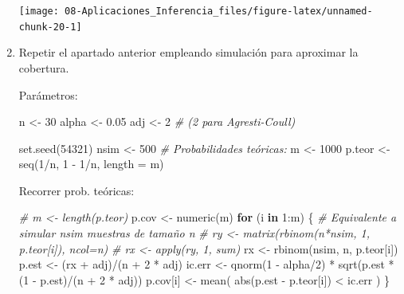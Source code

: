 \documentclass[
]{book}
\newenvironment{Shaded}{\begin{snugshade}}{\end{snugshade}}
\newcommand{\AttributeTok}[1]{\textcolor[rgb]{0.77,0.63,0.00}{#1}}
\newcommand{\CommentTok}[1]{\textcolor[rgb]{0.56,0.35,0.01}{\textit{#1}}}
\newcommand{\ControlFlowTok}[1]{\textcolor[rgb]{0.13,0.29,0.53}{\textbf{#1}}}
\newcommand{\DecValTok}[1]{\textcolor[rgb]{0.00,0.00,0.81}{#1}}
\newcommand{\FloatTok}[1]{\textcolor[rgb]{0.00,0.00,0.81}{#1}}
\newcommand{\FunctionTok}[1]{\textcolor[rgb]{0.00,0.00,0.00}{#1}}
\newcommand{\NormalTok}[1]{#1}
\newcommand{\OtherTok}[1]{\textcolor[rgb]{0.56,0.35,0.01}{#1}}
\newcommand{\SpecialCharTok}[1]{\textcolor[rgb]{0.00,0.00,0.00}{#1}}
\theoremstyle{break}
\theoremstyle{definition}
\theoremstyle{definition}
\theoremstyle{definition}
\theoremstyle{definition}
\theoremstyle{remark}
\begin{document}
\begin{enumerate}
  \begin{center}\texttt{[image: 08-Aplicaciones\_Inferencia\_files/figure-latex/unnamed-chunk-20-1]} \end{center}
\item
  Repetir el apartado anterior empleando simulación para aproximar
  la cobertura.

  Parámetros:

\begin{Shaded}
\begin{Highlighting}[]
\NormalTok{n }\OtherTok{\textless{}{-}} \DecValTok{30}
\NormalTok{alpha }\OtherTok{\textless{}{-}} \FloatTok{0.05}
\NormalTok{adj }\OtherTok{\textless{}{-}} \DecValTok{2}  \CommentTok{\#\textquotesingle{} (2 para Agresti{-}Coull)}

\FunctionTok{set.seed}\NormalTok{(}\DecValTok{54321}\NormalTok{)}
\NormalTok{nsim }\OtherTok{\textless{}{-}} \DecValTok{500} 
\CommentTok{\# Probabilidades teóricas:}
\NormalTok{m }\OtherTok{\textless{}{-}} \DecValTok{1000}
\NormalTok{p.teor }\OtherTok{\textless{}{-}} \FunctionTok{seq}\NormalTok{(}\DecValTok{1}\SpecialCharTok{/}\NormalTok{n, }\DecValTok{1} \SpecialCharTok{{-}} \DecValTok{1}\SpecialCharTok{/}\NormalTok{n, }\AttributeTok{length =}\NormalTok{ m) }
\end{Highlighting}
\end{Shaded}

  Recorrer prob. teóricas:

\begin{Shaded}
\begin{Highlighting}[]
\CommentTok{\# m \textless{}{-} length(p.teor)}
\NormalTok{p.cov }\OtherTok{\textless{}{-}} \FunctionTok{numeric}\NormalTok{(m)}
\ControlFlowTok{for}\NormalTok{ (i }\ControlFlowTok{in} \DecValTok{1}\SpecialCharTok{:}\NormalTok{m) \{}
  \CommentTok{\# Equivalente a simular nsim muestras de tamaño n}
  \CommentTok{\# ry \textless{}{-} matrix(rbinom(n*nsim, 1, p.teor[i]), ncol=n)}
  \CommentTok{\# rx \textless{}{-} apply(ry, 1, sum)}
\NormalTok{  rx }\OtherTok{\textless{}{-}} \FunctionTok{rbinom}\NormalTok{(nsim, n, p.teor[i])}
\NormalTok{  p.est }\OtherTok{\textless{}{-}}\NormalTok{ (rx }\SpecialCharTok{+}\NormalTok{ adj)}\SpecialCharTok{/}\NormalTok{(n }\SpecialCharTok{+} \DecValTok{2} \SpecialCharTok{*}\NormalTok{ adj)  }
\NormalTok{  ic.err }\OtherTok{\textless{}{-}} \FunctionTok{qnorm}\NormalTok{(}\DecValTok{1} \SpecialCharTok{{-}}\NormalTok{ alpha}\SpecialCharTok{/}\DecValTok{2}\NormalTok{) }\SpecialCharTok{*} \FunctionTok{sqrt}\NormalTok{(p.est }\SpecialCharTok{*}\NormalTok{ (}\DecValTok{1} \SpecialCharTok{{-}}\NormalTok{ p.est)}\SpecialCharTok{/}\NormalTok{(n }\SpecialCharTok{+} \DecValTok{2} \SpecialCharTok{*}\NormalTok{ adj))}
\NormalTok{  p.cov[i] }\OtherTok{\textless{}{-}} \FunctionTok{mean}\NormalTok{( }\FunctionTok{abs}\NormalTok{(p.est }\SpecialCharTok{{-}}\NormalTok{ p.teor[i]) }\SpecialCharTok{\textless{}}\NormalTok{ ic.err )}
\NormalTok{\}}
\end{Highlighting}
\end{Shaded}


\end{enumerate}
\end{document}
